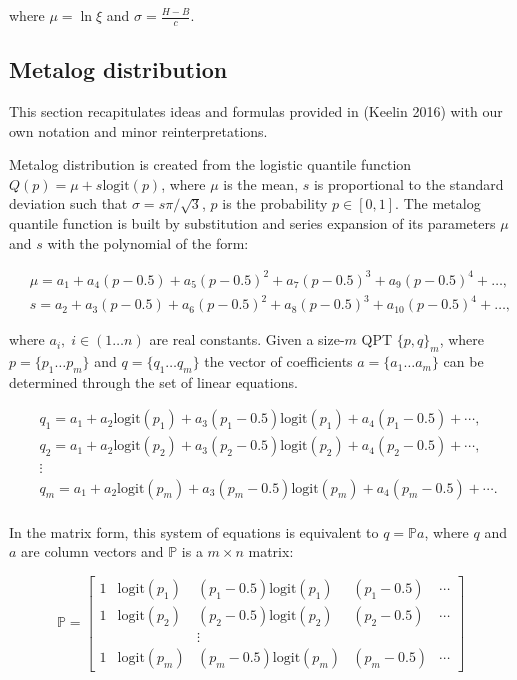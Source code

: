 \documentclass[
  letterpaper,
  DIV=11,
  numbers=noendperiod]{scrartcl}
\begin{document}
where \(\mu=\ln\xi\) and \(\sigma=\frac{H-B}{c}\).

\subsection*{Metalog distribution}\label{metalog-distribution}

This section recapitulates ideas and formulas provided in (Keelin 2016)
with our own notation and minor reinterpretations.

Metalog distribution is created from the logistic quantile function
\(Q(p)=\mu+s\text{logit}(p)\), where \(\mu\) is the mean, \(s\) is
proportional to the standard deviation such that \(\sigma=s\pi/\sqrt3\),
\(p\) is the probability \(p \in [0,1]\). The metalog quantile function
is built by substitution and series expansion of its parameters \(\mu\)
and \(s\) with the polynomial of the form:

\[
\begin{aligned}\;
&\mu=a_1+a_4(p-0.5)+a_5(p-0.5)^2+a_7(p-0.5)^3+a_9(p-0.5)^4+\dots, \\
& s=a_2+a_3(p-0.5)+a_6(p-0.5)^2+a_8(p-0.5)^3+a_{10}(p-0.5)^4+\dots,
\end{aligned}
\]

where \(a_i, \; i \in (1\dots n)\) are real constants. Given a
size-\(m\) QPT \(\{p, q\}_m\), where \(p=\{p_1\dots p_m\}\) and
\(q=\{q_1\dots q_m\}\) the vector of coefficients \(a=\{a_1\dots a_m\}\)
can be determined through the set of linear equations.

\[
\begin{aligned}\;
&q_1=a_1+a_2\text{logit}(p_1)+a_3(p_1-0.5)\text{logit}(p_1)+a_4(p_1-0.5)+\cdots,\\
&q_2=a_1+a_2\text{logit}(p_2)+a_3(p_2-0.5)\text{logit}(p_2)+a_4(p_2-0.5)+\cdots,\\
&\vdots\\
&q_m=a_1+a_2\text{logit}(p_m)+a_3(p_m-0.5)\text{logit}(p_m)+a_4(p_m-0.5)+\cdots.\\
\end{aligned}
\]

In the matrix form, this system of equations is equivalent to
\(q=\mathbb{P}a\), where \(q\) and \(a\) are column vectors and
\(\mathbb{P}\) is a \(m \times n\) matrix:

\[
\mathbb{P} = \left[\begin{array}{lllll}
1  &\text{logit}(p_1) &(p_1-0.5)\text{logit}(p_1) &(p_1-0.5) &\cdots\\
1  &\text{logit}(p_2) &(p_2-0.5)\text{logit}(p_2) &(p_2-0.5) &\cdots\\
   &                  &\vdots\\
1  &\text{logit}(p_m) &(p_m-0.5)\text{logit}(p_m) &(p_m-0.5) &\cdots
\end{array}\right]
\]
\end{document}
